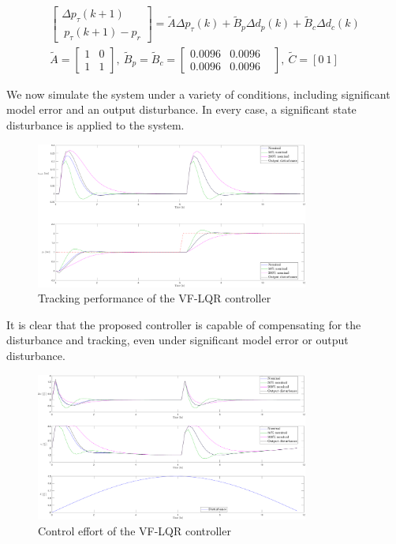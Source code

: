 \begin{equation}\label{eq:TankPressureVelocityMatrices}
\begin{gathered}
	 \begin{bmatrix}\Delta	p_\tau(k+1) \\\ p_\tau(k+1)-p_{r}
	\end{bmatrix} = \tilde{A} \Delta p_\tau(k) + \tilde{B}_p \Delta d_p(k) + \tilde{B}_c \Delta d_c(k)  \\
	\tilde{A} = \begin{bmatrix} 1 & 0 \\ 1 & 1 \end{bmatrix},
	 \ \tilde{B}_p = \tilde{B}_c = \begin{bmatrix} 0.0096 & 0.0096 & \\ 0.0096 & 0.0096\end{bmatrix}, \ \tilde{C} = [0 \ 1]	
\end{gathered}
\end{equation}

\clearpage

We now simulate the system under a variety of conditions, including significant model error and an output disturbance. In every case, a significant state disturbance is applied to the system.

\begin{figure}[h!]
	\centering
	\includegraphics[width=0.8\textwidth]{Pictures/LQRTracking.pdf}
	\caption{Tracking performance of the VF-LQR controller}
	\label{fig:LQRTracking}
\end{figure}

It is clear that the proposed controller is capable of compensating for the disturbance and tracking, even under significant model error or output disturbance.

\begin{figure}[h!]
	\centering
	\includegraphics[width=0.8\textwidth]{Pictures/LQRControls.pdf}
	\caption{Control effort of the VF-LQR controller}
	\label{fig:LQRControls}
\end{figure}

